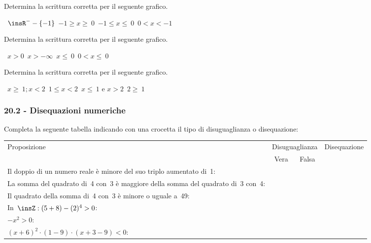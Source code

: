 \begin{esercizio}
 \label{ese:20.5}
Determina la scrittura corretta per il seguente grafico.
 \begin{center}
  

  \boxA\quad~$\insR^{-}-\{-1\}$\quad\boxB\quad~$-1\ge x\ge~0$\quad\boxC\quad~$-1\le x\le~0$\quad\boxD\quad~$0<x<-1$
 \end{center}
 \end{esercizio}

\begin{esercizio}
 \label{ese:20.6}
Determina la scrittura corretta per il seguente grafico.
 \begin{center}
  

  \boxA\quad~$x>0$\quad\boxB\quad~$x>-\infty $\quad\boxC\quad~$x\le~0$\quad\boxD\quad~$0<x\le~0$
 \end{center}
  \end{esercizio}

\begin{esercizio}
 \label{ese:20.7}
Determina la scrittura corretta per il seguente grafico.
 \begin{center}
  

  \boxA\quad~$x\ge~1;x<2$\quad\boxB\quad~$1\le x<2$\quad\boxC\quad~$x\le~1\text{ e }x>2$\quad\boxD\quad~$2\ge~1$
 \end{center}
  \end{esercizio}

\subsubsection*{20.2 - Disequazioni numeriche}
\begin{esercizio}
 \label{ese:20.8}
Completa la seguente tabella indicando con una crocetta il tipo di
disuguaglianza o disequazione:

 \begin{tabularx}{.9\textwidth}{Xccc}
 \toprule
 Proposizione&\multicolumn{2}{c}{Disuguaglianza}& Disequazione\\
  & Vera & Falsa & \\
 \midrule
 Il doppio di un numero reale è minore del suo triplo aumentato di~1: & & & \\
 La somma del quadrato di~4 con~3 è maggiore della somma del quadrato di~3 con~4: & & &\\
 Il quadrato della somma di~4 con~3 è minore o uguale a~49: & & & \\
 In~$\insZ:(5+8)-(2)^{4}>0$: & & & \\
 $-x^{2}>0$: & & & \\
 $(x+6)^{2}\cdot (1-9)\cdot (x+3-9)<0$: & & & \\
 \bottomrule
 \end{tabularx}
\end{esercizio}


